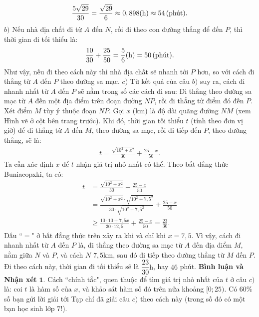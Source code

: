 \begin{multicols}{2}
	\begin{align*}
		\frac{{5\sqrt {29} }}{{30}} = \frac{{\sqrt {29} }}{6} \approx 0,898({\rm{h}}) \approx 54 \,(\text{\color{black}phút}).
	\end{align*}
	$b)$ Nếu nhà địa chất đi từ $A$ đến $N$, rồi đi theo con đường thẳng để đến $P$, thì thời gian đi tối thiểu là:
	\begin{align*}
		\frac{{10}}{{30}} + \frac{{25}}{{50}} = \frac{5}{6}({\rm{h}}) = 50 \,(\text{\color{black}phút}).
	\end{align*}
	Như vậy, nếu đi theo cách này thì nhà địa chất sẽ nhanh tới $P$ hơn, so với cách đi thẳng từ $A$ đến $P$ theo đường sa mạc.
	\vskip 0.05cm
	$c)$ Từ kết quả của câu $b)$ suy ra, cách đi nhanh nhất từ $A$ đến $P$ sẽ nằm trong số các cách đi sau: Đi thẳng theo đường sa mạc từ $A$ đến một địa điểm trên đoạn đường $NP$, rồi đi thẳng từ điểm đó đến $P$.
	\vskip 0.05cm
	Xét điểm $M$ tùy ý thuộc đoạn $NP$. Gọi $x$ (km) là độ dài quãng đường $NM$ (xem Hình vẽ ở cột bên trang trước). Khi đó, thời gian tối thiểu $t$ (tính theo đơn vị giờ) để đi thẳng từ $A$ đến $M$, theo đường sa mạc, rồi đi tiếp đến $P$, theo đường thẳng, sẽ là:
	\begin{align*}
		t = \frac{{\sqrt {{{10}^2} + {x^2}} }}{{30}} + \frac{{25 - x}}{{50}}.
	\end{align*}
	Ta cần xác định $x$ để $t$ nhận giá trị nhỏ nhất có thể.
	\vskip 0.05cm
	Theo bất đẳng thức Buniacopxki, ta có:
	\begin{align*}
			t &= \frac{{\sqrt {{{10}^2} + {x^2}} }}{{30}} + \frac{{25 - x}}{{50}} \\
			&= \frac{{\sqrt {{{10}^2} + {x^2}}  \cdot \sqrt {{{10}^2} + 7,{5^2}} }}{{30 \cdot \sqrt {{{10}^2} + 7,{5^2}} }} + \frac{{25 - x}}{{50}}\\
			 &\ge \frac{{10 \cdot 10 + 7,5x}}{{30 \cdot 12,5}} + \frac{{25 - x}}{{50}} = \frac{{23}}{{30}}.
	\end{align*}
	Dấu ``$=$" ở bất đẳng thức trên xảy ra khi và chỉ khi $x = 7,5$.
	\vskip 0.05cm
	Vì vậy, cách đi nhanh nhất từ $A$ đến $P$ là, đi thẳng theo đường sa mạc từ $A$ đến địa điểm $M$, nằm giữa $N$ và $P$, và cách $N$ $7,5$km, sau đó đi tiếp theo đường thẳng từ $M$ đến $P$. Đi theo cách này, thời gian đi tối thiểu sẽ là $\dfrac{23}{30}\text{h}$, hay $46$ phút.
	\vskip 0.05cm
	\textbf{\color{thachthuctoanhoc}Bình luận và Nhận xét}
	\vskip 0.05cm
	$\pmb{1.}$ Cách ``chính tắc", quen thuộc để tìm giá trị nhỏ nhất của $t$ ở câu $c)$ là: coi $t$ là hàm số của $x$, và khảo sát hàm số đó trên nửa khoảng $[0; 25)$. Có $60\%$ số bạn gửi lời giải tới Tạp chí đã giải câu $c)$ theo cách này (trong số đó có một bạn học sinh lớp $7$!).

\end{multicols}
